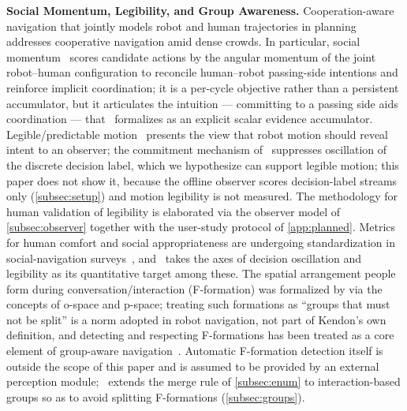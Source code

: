 \noindent\textbf{Social Momentum, Legibility, and Group Awareness.} Cooperation-aware navigation that jointly models robot and human trajectories in planning~\citep{trautman2015dense} addresses cooperative navigation amid dense crowds. In particular, social momentum~\citep{mavrogiannis2022momentum} scores candidate actions by the angular momentum of the joint robot--human configuration to reconcile human--robot passing-side intentions and reinforce implicit coordination; it is a per-cycle objective rather than a persistent accumulator, but it articulates the intuition --- committing to a passing side aids coordination --- that \sname\ formalizes as an explicit scalar evidence accumulator. Legible/predictable motion~\citep{dragan2013legibility} presents the view that robot motion should reveal intent to an observer; the commitment mechanism of \sname\ suppresses oscillation of the discrete decision label, which we hypothesize can support legible motion; this paper does not show it, because the offline observer scores decision-label streams only (\cref{subsec:setup}) and motion legibility is not measured. The methodology for human validation of legibility is elaborated via the observer model of \cref{subsec:observer} together with the user-study protocol of \cref{app:planned}. Metrics for human comfort and social appropriateness are undergoing standardization in social-navigation surveys~\citep{mavrogiannis2023survey,gao2022evaluation,francis2023principles}, and \sname\ takes the axes of decision oscillation and legibility as its quantitative target among these. The spatial arrangement people form during conversation/interaction (F-formation) was formalized by \citet{kendon1990conducting} via the concepts of o-space and p-space; treating such formations as ``groups that must not be split'' is a norm adopted in robot navigation, not part of Kendon's own definition, and detecting and respecting F-formations has been treated as a core element of group-aware navigation~\citep{riosmartinez2015survey}. Automatic F-formation detection itself is outside the scope of this paper and is assumed to be provided by an external perception module; \sname\ extends the merge rule of \cref{subsec:enum} to interaction-based groups so as to avoid splitting F-formations (\cref{subsec:groups}).


